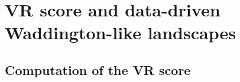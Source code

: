 
\section{VR score and data-driven Waddington-like landscapes}

\subsection{Computation of the VR score}

